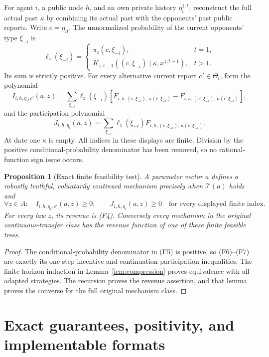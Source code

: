 \documentclass[11pt,a4paper]{article}
\newtheorem{proposition}[theorem]{Proposition}
\begin{document}
For agent $i$, a public node $h$, and an own private history
$\eta_i^{1:t}$, reconstruct the full actual past $\kappa$ by combining
its actual past with the opponents' past public reports. Write
$c=\eta_{it}$. The unnormalized probability of the current opponents'
type $\xi_{-i}$ is
\[
 \ell_z(\xi_{-i})=
 \begin{cases}
 \pi_z(c,\xi_{-i}),&t=1,\\
 K_{z,t-1}((c,\xi_{-i})\mid\kappa,x^{1:t-1}),&t>1.
 \end{cases}
 \tag{F5}
\]
Its sum is strictly positive. For every alternative current report
$c'\in\Theta_i$, form the polynomial
\[
 I_{i,h,\eta_i,c'}(a,z)=
 \sum_{\xi_{-i}}\ell_z(\xi_{-i})
 \left[
 F_{i,h,(c,\xi_{-i}),\,\kappa(c,\xi_{-i})}
 -
 F_{i,h,(c',\xi_{-i}),\,\kappa(c,\xi_{-i})}
 \right],
 \tag{F6}
\]
and the participation polynomial
\[
 J_{i,h,\eta_i}(a,z)=
 \sum_{\xi_{-i}}\ell_z(\xi_{-i})
 F_{i,h,(c,\xi_{-i}),\,\kappa(c,\xi_{-i})}.
 \tag{F7}
\]
At date one $\kappa$ is empty. All indices in these displays are finite.
Division by the positive conditional-probability denominator has been
removed, so no rational-function sign issue occurs.

\begin{proposition}[Exact finite feasibility test]\label{prop:finite-test}
A parameter vector $a$ defines a robustly truthful, voluntarily continued
mechanism precisely when $\mathcal T(a)$ holds and
\[
 \forall z\in A:\quad I_{i,h,\eta_i,c'}(a,z)\geq0,\qquad
 J_{i,h,\eta_i}(a,z)\geq0
 \quad\text{for every displayed finite index.}
 \tag{F8}
\]
For every law $z$, its revenue is \textup{(F4)}. Conversely every mechanism
in the original continuous-transfer class has the revenue function of
one of these finite feasible trees.
\end{proposition}
\begin{proof}
The conditional-probability denominator in \textup{(F5)} is positive,
so \textup{(F6)--(F7)} are exactly its one-step incentive and continuation
participation inequalities. The finite-horizon induction in
Lemma~\ref{lem:compression} proves equivalence with all adapted strategies.
The recursion proves the revenue assertion, and that lemma proves the
converse for the full original mechanism class.
\end{proof}

\section{Exact guarantees, positivity, and implementable formats}
\label{sec:elimination}
\end{document}
